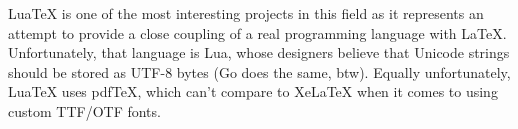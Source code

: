 LuaTeX is one of the most interesting projects in this field as it
represents an attempt to provide a close coupling of a real programming
language with LaTeX. Unfortunately, that language is Lua, whose
designers believe that Unicode strings should be stored as UTF-8 bytes
(Go does the same, btw). Equally unfortunately, LuaTeX uses pdfTeX,
which can't compare to XeLaTeX when it comes to using custom TTF/OTF
fonts.
